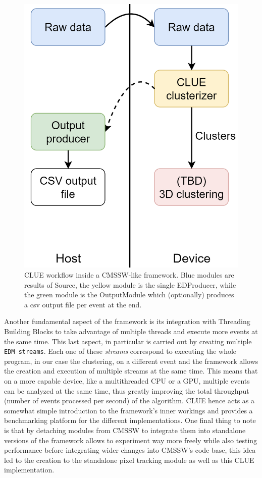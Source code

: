 \begin{figure}[H]
    \centering
    \includegraphics[scale=0.7]{media/hclue_workflow.png}
    \caption{CLUE workflow inside a CMSSW-like framework. Blue modules are results of Source, the yellow module is the single EDProducer, while the green module is the OutputModule which (optionally) produces a csv output file per event at the end.}
    \label{fig:hclue_workflow}
\end{figure}

Another fundamental aspect of the framework is its integration with Threading Building Blocks to take advantage of multiple threads and execute more events at the same time. This last aspect, in particular is carried out by creating multiple \Verb "EDM streams". Each one of these \emph{streams} correspond to executing the whole program, in our case the clustering, on a different event and the framework allows the creation and execution of multiple streams at the same time. This means that on a more capable device, like a multithreaded CPU or a GPU, multiple events can be analyzed at the same time, thus greatly improving the total throughput (number of events processed per second) of the algorithm.
CLUE hence acts as a somewhat simple introduction to the framework's inner workings and provides a benchmarking platform for the different implementations. One final thing to note is that by detaching modules from CMSSW to integrate them into standalone versions of the framework allows to experiment way more freely while also testing performance before integrating wider changes into CMSSW's code base, this idea led to the creation to the standalone pixel tracking module as well as this CLUE implementation.

